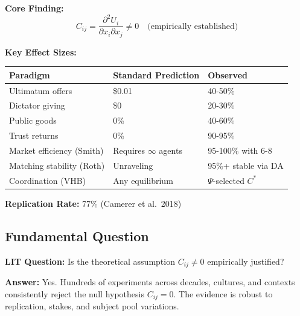 \begin{tcolorbox}[colback=yellow!10!white, colframe=orange!75!black,
    title=\textbf{Quick Reference}]

\textbf{Core Finding:}
\begin{equation}
C_{ij} = \frac{\partial^2 U_i}{\partial x_i \partial x_j} \neq 0 \quad \text{(empirically established)}
\tag{EV-Core}
\end{equation}

\textbf{Key Effect Sizes:}
\begin{center}
\small
\begin{tabular}{@{}lll@{}}
\toprule
\textbf{Paradigm} & \textbf{Standard Prediction} & \textbf{Observed} \\
\midrule
Ultimatum offers & \$0.01 & 40-50\% \\
Dictator giving & \$0 & 20-30\% \\
Public goods & 0\% & 40-60\% \\
Trust returns & 0\% & 90-95\% \\
Market efficiency (Smith) & Requires $\infty$ agents & 95-100\% with 6-8 \\
Matching stability (Roth) & Unraveling & 95\%+ stable via DA \\
Coordination (VHB) & Any equilibrium & $\Psi$-selected $C^*$ \\
\bottomrule
\end{tabular}
\end{center}

\textbf{Replication Rate:} 77\% (Camerer et al.\ 2018)

\end{tcolorbox}


\subsection{Fundamental Question}

\begin{tcolorbox}[colback=purple!5!white, colframe=purple!75!black]
\textbf{LIT Question:} Is the theoretical assumption $C_{ij} \neq 0$
empirically justified?

\textbf{Answer:} Yes. Hundreds of experiments across decades, cultures, and
contexts consistently reject the null hypothesis $C_{ij} = 0$. The evidence
is robust to replication, stakes, and subject pool variations.
\end{tcolorbox}

